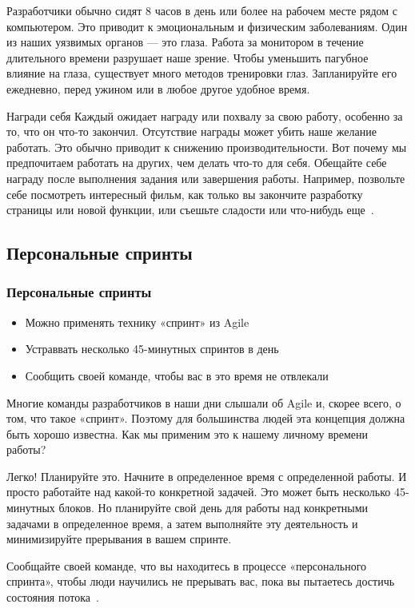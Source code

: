 \documentclass{../industrial-development}
\begin{document}
Разработчики обычно сидят 8 часов в день или более на рабочем месте рядом с компьютером. Это приводит к эмоциональным и физическим заболеваниям. Один из наших уязвимых органов --- это глаза. Работа за монитором в течение длительного времени разрушает наше зрение. Чтобы уменьшить пагубное влияние на глаза, существует много методов тренировки глаз. Запланируйте его ежедневно, перед ужином или в любое другое удобное время.

Награди себя
Каждый ожидает награду или похвалу за свою работу, особенно за то, что он что-то закончил. Отсутствие награды может убить наше желание работать. Это обычно приводит к снижению производительности. Вот почему мы предпочитаем работать на других, чем делать что-то для себя. Обещайте себе награду после выполнения задания или завершения работы. Например, позвольте себе посмотреть интересный фильм, как только вы закончите разработку страницы или новой функции, или съешьте сладости или что-нибудь еще~\cite{TMCodeProject}.

\subsection{Персональные спринты}

\begin{frame} \frametitle{Персональные спринты}
  \begin{itemize}
  \item Можно применять технику «спринт» из Agile
  \item Устраввать несколько 45-минутных спринтов в день
  \item Сообщить своей команде, чтобы вас в это время не отвлекали
  \end{itemize}
\end{frame}

\lecturenotes

Многие команды разработчиков в наши дни слышали об Agile и, скорее всего, о том, что такое «спринт». Поэтому для большинства людей эта концепция должна быть хорошо известна. Как мы применим это к нашему личному времени работы?

Легко! Планируйте это. Начните в определенное время с определенной работы. И просто работайте над какой-то конкретной задачей. Это может быть несколько 45-минутных блоков. Но планируйте свой день для работы над конкретными задачами в определенное время, а затем выполняйте эту деятельность и минимизируйте прерывания в вашем спринте.

Сообщайте своей команде, что вы находитесь в процессе «персонального спринта», чтобы люди научились не прерывать вас, пока вы пытаетесь достичь состояния потока~\cite{TMSeimer}.
\end{document}
